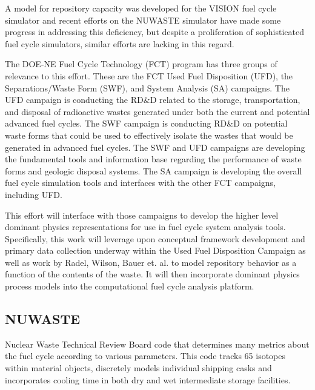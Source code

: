 A model for repository capacity was developed for the VISION fuel cycle
simulator \cite{yacout_visionverifiable_2006} \cite{radel_repository_2007} and
recent efforts on the NUWASTE simulator \cite{ abkowitz_nuclear_2010} have made
some progress in addressing this deficiency, but despite a proliferation of
sophisticated fuel cycle simulators, similar efforts are lacking in this
regard. 


The DOE-NE Fuel Cycle Technology (FCT) program has three groups of relevance to 
this effort.  These are the FCT Used Fuel Disposition (UFD), the 
Separations/Waste Form (SWF), and System Analysis (SA) campaigns.  The UFD 
campaign is conducting the RD\&D related to the storage, transportation, and 
disposal of radioactive wastes generated under both the current and potential 
advanced fuel cycles.  The SWF campaign is conducting RD\&D on potential waste 
forms that could be used to effectively isolate the wastes that would be 
generated in advanced fuel cycles.  The SWF and UFD campaigns are developing the 
fundamental tools and information base regarding the performance of waste forms 
and geologic disposal systems.  The SA campaign is developing the overall fuel 
cycle simulation tools and interfaces with the other FCT campaigns, including 
UFD.  

This effort will interface with those campaigns to develop the higher level
dominant physics representations for use in fuel cycle system analysis tools.
Specifically, this work will leverage upon conceptual framework development and
primary data collection underway within the Used Fuel Disposition Campaign as
well as work by Radel, Wilson, Bauer et. al. to model repository behavior as a
function of the contents of the waste.  It will then incorporate dominant
physics process models into the \Cyclus computational fuel cycle analysis
platform.





\clearpage

\subsection{NUWASTE} Nuclear Waste Technical Review Board code that determines
many metrics about the fuel cycle according to various parameters.
\cite{abkowitz_nuclear_2010} This code tracks 65 isotopes within material
objects, discretely models individual shipping casks and incorporates cooling
time in both dry and wet intermediate storage facilities.

